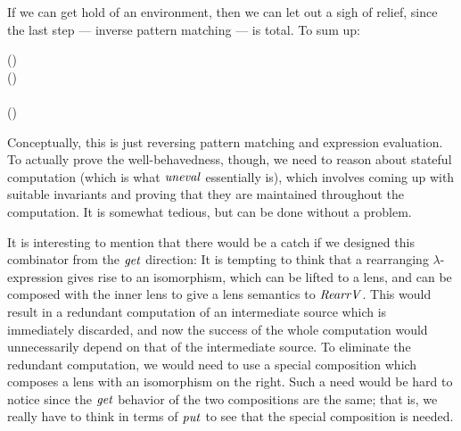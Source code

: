 If we can get hold of an environment, then we can let out a sigh of relief, since the last step --- inverse pattern matching --- is total.
To sum up:
\begin{hscode}\SaveRestoreHook
{}%
%
%
%
%
\>[B]{}\;(\;\;\;)\;{}\<[21]%
\>[21]{}\mathrel{=}\;{}\<[29]%
\>[29]{}\<[34]%
\>[34]{}\leftarrow {}\;\;\<[E]%
\\
\>[29]{}\<[34]%
\>[34]{}\leftarrow {}\;\;\;\;(\;){}\<[E]%
\\
\>[29]{}\<[34]%
\>[34]{}\leftarrow {}\;\;\<[E]%
\\
\>[29]{}\;(\;\;){}\<[E]%
\ColumnHook
\end{hscode}\resethooks
Conceptually, this is just reversing pattern matching and expression evaluation. To actually prove the well-behavedness, though, we need to reason about stateful computation (which is what \ensuremath{\Varid{uneval}} essentially is), which involves coming up with suitable invariants and proving that they are maintained throughout the computation.
It is somewhat tedious, but can be done without a problem.

It is interesting to mention that there would be a catch if we designed this combinator from the \ensuremath{\Varid{get}} direction: It is tempting to think that a rearranging $\lambda$-expression gives rise to an isomorphism, which can be lifted to a lens, and can be composed with the inner lens to give a lens semantics to \ensuremath{\Conid{RearrV}}.
This would result in a redundant computation of an intermediate source which is immediately discarded, and now the success of the whole computation would unnecessarily depend on that of the intermediate source.
To eliminate the redundant computation, we would need to use a special composition which composes a lens with an isomorphism on the right.
Such a need would be hard to notice since the \ensuremath{\Varid{get}} behavior of the two compositions are the same; that is, we really have to think in terms of \ensuremath{\Varid{put}} to see that the special composition is needed.




















